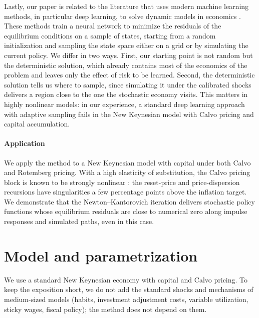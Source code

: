 \documentclass[11pt]{article}
\begin{document}
Lastly, our paper is related to the literature that uses modern machine
learning methods, in particular deep learning, to solve dynamic models in
economics \citep{maliar2021deep, azinovic2022deep, kahou2021exploiting,
han2026deepham, kase2022estimating, barnett2023deep, fernandez2023financial,
jungerman2023dynamic, duarte2024machine, payne2024deep}. These methods train a
neural network to minimize the residuals of the equilibrium conditions on a
sample of states, starting from a random initialization and sampling the state
space either on a grid or by simulating the current policy. We differ in two
ways. First, our starting point is not random but the deterministic solution,
which already contains most of the economics of the problem and leaves only
the effect of risk to be learned. Second, the deterministic solution tells us
where to sample, since simulating it under the calibrated shocks delivers a
region close to the one the stochastic economy visits. This matters in highly
nonlinear models: in our experience, a standard deep learning approach with
adaptive sampling fails in the New Keynesian model with Calvo pricing and
capital accumulation.



\paragraph{Application} We apply the method to a New Keynesian model with 
capital under both Calvo and Rotemberg pricing. With a high elasticity of 
substitution, the Calvo pricing block is known to be strongly nonlinear 
\citep{ascari2014macroeconomics}: the reset-price and price-dispersion 
recursions have singularities a few percentage points above the inflation target.
We demonstrate that the Newton--Kantorovich iteration delivers stochastic 
policy functions whose equilibrium residuals are close to numerical zero 
along impulse responses and simulated paths, even in this case.



\section{Model and parametrization}

We use a standard New Keynesian economy with capital and Calvo pricing. To keep the exposition short, we do not add the standard shocks and mechanisms of medium-sized models (habits, investment adjustment costs, variable utilization, sticky wages, fiscal policy); the method does not depend on them.
\end{document}
